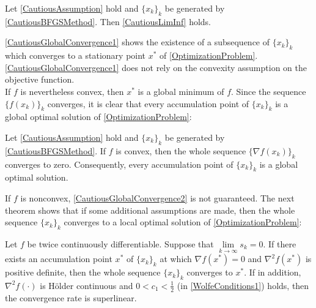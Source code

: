 \begin{theorem}\label{CautiousGlobalConvergence1}
    Let \cref{CautiousAssumption} hold and $\{ x_k \}_k$ be generated by \cref{CautiousBFGSMethod}. Then \cref{CautiousLimInf} holds.
\end{theorem}

\cref{CautiousGlobalConvergence1} shows the existence of a subsequence of $\{ x_k \}_k$ which converges to a stationary point $x^*$ of \cref{OptimizationProblem}. \cref{CautiousGlobalConvergence1} does not rely on the convexity assumption on the objective function. \\
If $f$ is nevertheless convex, then $x^*$ is a global minimum of $f$. Since the sequence $\{ f(x_k) \}_k$ converges, it is clear that every accumulation point of $\{ x_k \}_k$ is a global optimal solution of \cref{OptimizationProblem}: 

\begin{corollary}\label{CautiousGlobalConvergence2}
    Let \cref{CautiousAssumption} hold and $\{ x_k \}_k$ be generated by \cref{CautiousBFGSMethod}. If $f$ is convex, then the whole sequence $\{\nabla f(x_k)\}_k$ converges to zero. Consequently, every accumulation point of $\{ x_k \}_k$ is a global optimal solution.
\end{corollary}

If $f$ is nonconvex, \cref{CautiousGlobalConvergence2} is not guaranteed. The next theorem shows that if some additional assumptions are made, then the whole sequence $\{ x_k \}_k$ converges to a local optimal solution of \cref{OptimizationProblem}: 

\begin{theorem}\label{CautiousLocalConvergence}
    Let $f$ be twice continuously differentiable. Suppose that $\lim\limits_{k \to \infty} s_k = 0$. If there exists an accumulation point $x^*$ of $\{ x_k \}_k$ at which $\nabla f(x^*) = 0$ and $\nabla^2 f(x^*)$ is positive definite, then the whole sequence $\{ x_k \}_k$ converges to $x^*$. If in addition, $\nabla^2 f(\cdot)$ is Hölder continuous and $0 < c_1 < \frac{1}{2}$ (in \cref{WolfeConditions1}) holds, then the convergence rate is superlinear.
\end{theorem}

